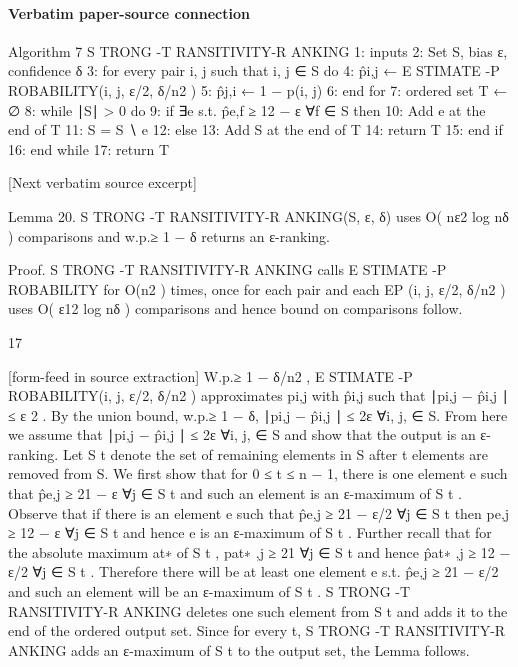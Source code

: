 \documentclass[10pt]{article}
\begin{document}
\paragraph{Verbatim paper-source connection}
\begin{ReviewVerbatim}
Algorithm 7 S TRONG -T RANSITIVITY-R ANKING
 1: inputs
 2:   Set S, bias ε, confidence δ
 3: for every pair {i, j} such that i, j ∈ S do
 4:   p̂i,j ← E STIMATE -P ROBABILITY(i, j, ε/2, δ/n2 )
 5:   p̂j,i ← 1 − p(i, j)
 6: end for
 7: ordered set T ← ∅
 8: while ∣S∣ > 0 do
 9:   if ∃e s.t. p̂e,f ≥ 12 − ε ∀f ∈ S then
10:       Add e at the end of T
11:       S = S ∖ {e}
12:   else
13:       Add S at the end of T
14:       return T
15:   end if
16: end while
17: return T

[Next verbatim source excerpt]

Lemma 20. S TRONG -T RANSITIVITY-R ANKING(S, ε, δ) uses O( nε2 log nδ ) comparisons and w.p.≥ 1 − δ
returns an ε-ranking.

Proof. S TRONG -T RANSITIVITY-R ANKING calls E STIMATE -P ROBABILITY for O(n2 ) times, once for each
pair and each EP (i, j, ε/2, δ/n2 ) uses O( ε12 log nδ ) comparisons and hence bound on comparisons follow.


                                                      17

[form-feed in source extraction]
W.p.≥ 1 − δ/n2 , E STIMATE -P ROBABILITY(i, j, ε/2, δ/n2 ) approximates pi,j with p̂i,j such that ∣pi,j − p̂i,j ∣ ≤
 ε
 2
   . By the union bound, w.p.≥ 1 − δ, ∣pi,j − p̂i,j ∣ ≤ 2ε ∀i, j, ∈ S. From here we assume that ∣pi,j − p̂i,j ∣ ≤ 2ε
∀i, j, ∈ S and show that the output is an ε-ranking. Let S t denote the set of remaining elements in S after
t elements are removed from S. We first show that for 0 ≤ t ≤ n − 1, there is one element e such that
p̂e,j ≥ 21 − ε ∀j ∈ S t and such an element is an ε-maximum of S t . Observe that if there is an element e such
that p̂e,j ≥ 21 − ε/2 ∀j ∈ S t then pe,j ≥ 12 − ε ∀j ∈ S t and hence e is an ε-maximum of S t . Further recall
that for the absolute maximum at∗ of S t , pat∗ ,j ≥ 21 ∀j ∈ S t and hence p̂at∗ ,j ≥ 12 − ε/2 ∀j ∈ S t . Therefore
there will be at least one element e s.t. p̂e,j ≥ 21 − ε/2 and such an element will be an ε-maximum of S t .
S TRONG -T RANSITIVITY-R ANKING deletes one such element from S t and adds it to the end of the ordered
output set. Since for every t, S TRONG -T RANSITIVITY-R ANKING adds an ε-maximum of S t to the output set,
the Lemma follows.
\end{ReviewVerbatim}
\end{document}
